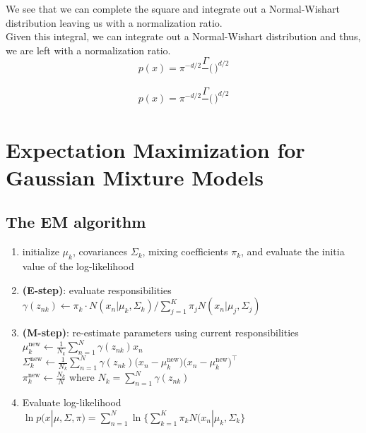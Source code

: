 \documentclass{article}
\begin{document}
\noindent
We see that we can complete the square and integrate out a Normal-Wishart distribution leaving us with a normalization ratio.\\

Given this integral, we can integrate out a Normal-Wishart distribution and thus, we are left with a normalization ratio. \\

$$p(x) = \pi^{-d/2} \frac{\Gamma}{} \Bigg( \frac{}{} \Bigg )^{d/2}$$

$$p(x) = \pi^{-d/2} \frac{\Gamma}{} \Bigg( \frac{}{} \Bigg )^{d/2}$$



\newpage
\section{Expectation Maximization for Gaussian Mixture Models}

\subsection{The EM algorithm}
\begin{enumerate}
	\item initialize $\mu_k$, covariances $\Sigma_k$, mixing coefficients $\pi_k$, and evaluate the initia value of the log-likelihood
	\item \textbf{(E-step)}: evaluate responsibilities\\
$\gamma(z_{nk}) \leftarrow \pi_k \cdot N(x_n | \mu_k, \Sigma_k) / \displaystyle \sum_{j=1}^K \pi_j N(x_n | \mu_j, \Sigma_j)$ \\
		\item \textbf{(M-step)}: re-estimate parameters using current responsibilities\\
	$\mu_k^{\text{new}} \leftarrow \frac{1}{N_k} \displaystyle \sum_{n=1}^N \gamma(z_{nk}) x_n$ \\
$\Sigma_k^{\text{new}} \leftarrow \frac{1}{N_k} \displaystyle \sum_{n=1}^N \gamma(z_{nk}) \Big(x_n - \mu_k^\text{new}\Big)\Big(x_n - \mu_k^\text{new}\Big)^\top$ \\
$ \pi_k^\text{new} \leftarrow \frac{N_k}{N}$ where $N_k = \displaystyle \sum_{n=1}^N \gamma(z_{nk})$

\item Evaluate log-likelihood \\
$\ln p(x | \mu, \Sigma, \pi) = \displaystyle \sum_{n=1}^N  \ln \Big\{ \sum_{k=1}^K \pi_k N(x_n | \mu_k, \Sigma_k \Big\} $

\end{enumerate}
\end{document}
